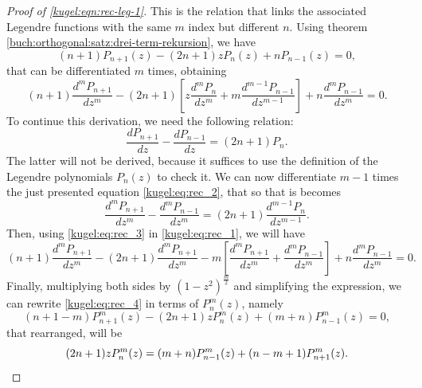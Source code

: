 \begin{proof}[Proof of \eqref{kugel:eqn:rec-leg-1}]
  This is the relation that links the associated Legendre functions with the
  same $m$ index but different $n$. Using theorem
  \ref{buch:orthogonal:satz:drei-term-rekursion}, we have 
  \begin{equation*}
    (n+1)P_{n+1}(z)-(2n+1)zP_n(z)+nP_{n-1}(z)=0,
  \end{equation*}
  that can be differentiated $m$ times, obtaining
  \begin{equation}
    \label{kugel:eq:rec_1}
    (n+1)\frac{d^mP_{n+1}}{dz^m}-(2n+1) \left[
      z \frac{d^m P_n}{dz^m}+ m\frac{d^{m-1}P_{n-1}}{dz^{m-1}}
    \right] + n\frac{d^m P_{n-1}}{dz^m} = 0.
  \end{equation}
  To continue this derivation, we need the following relation:
  \begin{equation}
    \label{kugel:eq:rec_2}
    \frac{dP_{n+1}}{dz} - \frac{dP_{n-1}}{dz} = (2n+1)P_n.
  \end{equation}
  The latter will not be derived, because it suffices to use the definition of
  the Legendre polynomials $P_n(z)$ to check it.  We can now differentiate $m-1$
  times the just presented equation \eqref{kugel:eq:rec_2}, that so that is
  becomes
  \begin{equation}
    \label{kugel:eq:rec_3}
    \frac{d^mP_{n+1}}{dz^m} - \frac{d^mP_{n-1}}{dz^m}
    = (2n+1)\frac{d^{m-1}P_n}{dz^{m-1}}.
  \end{equation}
  Then, using \eqref{kugel:eq:rec_3} in \eqref{kugel:eq:rec_1}, we will
  have
  \begin{equation}
    \label{kugel:eq:rec_4}
    (n+1)\frac{d^mP_{n+1}}{dz^m}
      - (2n+1)\frac{d^mP_{n+1}}{dz^m}
      - m\left[\frac{d^m P_{n+1}}{dz^m}
      + \frac{d^{m}P_{n-1}}{dz^m}\right]
      + n\frac{d^m P_{n-1}}{dz^m}=0.
  \end{equation}
  Finally, multiplying both sides by $(1-z^2)^{\frac{m}{2}}$ and simplifying the
  expression, we can rewrite \eqref{kugel:eq:rec_4} in terms of $P^m_n(z)$,
  namely
  \begin{equation*}
    (n+1-m)P^m_{n+1}(z)-(2n+1)zP^m_n(z)+(m+n)P^m_{n-1}(z)=0,
  \end{equation*}
  that rearranged, will be
  \begin{equation*}
    (2n+1) z P^m_n(z)= (m+n) P^m_{n-1}(z) + (n-m+1) P^m_{n+1}(z).
    \qedhere
  \end{equation*}
\end{proof}

